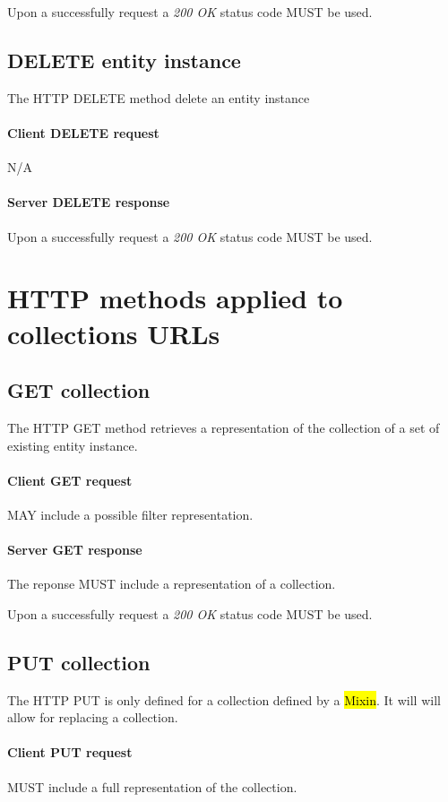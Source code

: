 \documentclass[10pt,a4paper]{article}
\begin{document}
Upon a successfully request a \emph{200 OK} status code MUST be used.

\subsection{DELETE entity instance}
The HTTP DELETE method delete an entity instance

\paragraph{Client DELETE request}
N/A

\paragraph{Server DELETE response}
Upon a successfully request a \emph{200 OK} status code MUST be used.

\section{HTTP methods applied to collections URLs}

\subsection{GET collection}
The HTTP GET method retrieves a representation of the collection of a set of existing entity instance.

\paragraph{Client GET request}
MAY include a possible filter representation.

\paragraph{Server GET response}
The reponse MUST include a representation of a collection.

Upon a successfully request a \emph{200 OK} status code MUST be used.

\subsection{PUT collection}
The HTTP PUT is only defined for a collection defined by a \hl{Mixin}. It will will allow for replacing a collection.

\paragraph{Client PUT request}
MUST include a full representation of the collection.
\end{document}
